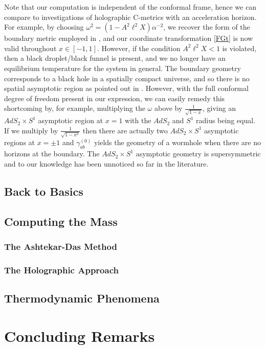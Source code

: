 \documentclass[
twoside,
openright,
frontopenright,
]{dmathesis}
\begin{document}
Note that our computation is independent of the conformal frame, hence
we can compare to investigations of holographic C-metrics with an
acceleration horizon. For example, by choosing $\omega^2 =
(1-A^{2}\ell^{2}X)\alpha^{-2}$, we recover the form of the boundary metric
employed in \cite{Hubeny:2009kz}, and our coordinate transformation
\eqref{FGt} is now valid throughout $x\in[-1,1]$. However, if the condition
$ A^{2}\ell^{2} X <1$ is violated, then a black droplet/black funnel is present,
and we no longer have an equilibrium temperature for the system in general.
The boundary geometry corresponds to a black hole in a spatially compact
universe, and so there is no spatial asymptotic region as pointed out
in \cite{Hubeny:2009kz}. However, with the full conformal degree of
freedom present in our expression, we can easily remedy this shortcoming
by, for example, multiplying the $\omega$ above by $\frac{1}{\sqrt{1-x}}$,
giving an $AdS_{2}\times S^{1}$ asymptotic region at $x=1$ with the $AdS_{2}$
and $S^{1}$ radius being equal. If we multiply by $\frac{1}{\sqrt{1-x^2}}$ then
there are actually two $AdS_{2}\times S^{1}$ asymptotic regions at $x=\pm1$
and $\gamma^{(0)}_{ab}$ yields the geometry of a wormhole when there are no
horizons at the boundary.
The $AdS_{2}\times S^{1}$ asymptotic geometry is supersymmetric
and to our knowledge has been unnoticed so far in the literature.

\section{Back to Basics}
\label{sec:basics}

\section{Computing the Mass}
\label{sec:mass-comput}

\subsection{The Ashtekar-Das Method}
\label{sec:ashtekar-das}

\subsection{The Holographic Approach}
\label{sec:holo}

\section{Thermodynamic Phenomena}
\label{sec:phenomena}


\chapter{Concluding Remarks}


%
%


{}


\end{document}
